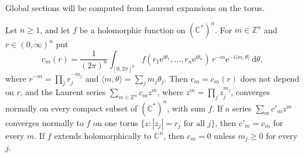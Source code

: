 Global sections will be computed from Laurent expansions on the torus.

\begin{lemma}\label{lem:torus-laurent-expansion}
Let $n\geq1$, and let $f$ be a holomorphic function on $(\mathbb C^*)^n$. For $m\in\mathbb Z^n$ and $r\in(0,\infty)^n$ put
\[
 c_m(r)=\frac1{(2\pi)^n}\int_{[0,2\pi]^n}f(r_1\mathrm e^{\mathrm i\theta_1},\ldots,r_n\mathrm e^{\mathrm i\theta_n})\,r^{-m}\mathrm e^{-\mathrm i\langle m,\theta\rangle}\,\mathrm d\theta,
\]
where $r^{-m}=\prod_jr_j^{-m_j}$ and $\langle m,\theta\rangle=\sum_jm_j\theta_j$. Then $c_m=c_m(r)$ does not depend on $r$, and the Laurent series $\sum_{m\in\mathbb Z^n}c_mz^m$, where $z^m=\prod_jz_j^{m_j}$, converges normally on every compact subset of $(\mathbb C^*)^n$, with sum $f$. If a series $\sum_mc'_mz^m$ converges normally to $f$ on one torus $\{z:|z_j|=r_j\text{ for all }j\}$, then $c'_m=c_m$ for every $m$. If $f$ extends holomorphically to $\mathbb C^n$, then $c_m=0$ unless $m_j\geq0$ for every $j$.
\end{lemma}
